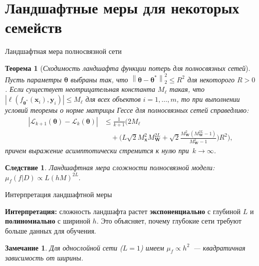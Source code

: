 \documentclass[10pt,pdf,hyperref={unicode}]{beamer}
\newtheorem{rustheorem}{Теорема}
\newtheorem{rusremark}{Замечание}
\newtheorem{ruscorollary}{Следствие}
\begin{document}
\section{Ландшафтные меры для некоторых семейств}
\begin{frame}{Ландшафтная мера полносвязной сети}
\justifying
\small

\begin{rustheorem}[\emph{Сходимость ландшафта функции потерь для полносвязных сетей}]
Пусть параметры $\boldsymbol{\theta}$ выбраны так, что $\left\|\boldsymbol{\theta} - \boldsymbol{\theta}^*\right\|_2^2 \leqslant R^2$ для некоторого $R > 0$. Если существует неотрицательная константа $M_{\ell}$ такая, что $\left| \ell(f_{\boldsymbol{\theta}^*}(\mathbf{x}_{i}), \mathbf{y}_{i}) \right| \leqslant M_{\ell}$ для всех объектов $i = 1, \ldots, m$, то при выполнении условий теоремы о норме матрицы Гессе для полносвязных сетей справедливо:
\begin{align*}
\left|\mathcal{L}_{k+1}(\boldsymbol{\theta}) - \mathcal{L}_k(\boldsymbol{\theta})\right| &\leqslant \frac{1}{k+1}\Biggl( 2M_{\ell} \\
&\quad + \Biggl( L \sqrt{2} M_{\mathbf{x}}^2 M_{\mathbf{W}}^{2L} + \sqrt{2} \frac{M_{\mathbf{W}}^2 (M_{\mathbf{W}}^{2L} - 1)}{M_{\mathbf{W}}^2 - 1} \Biggr) R^2 \Biggr),
\end{align*}
причем выражение асимптотически стремится к нулю при~$k \to \infty$.
\end{rustheorem}

\begin{ruscorollary}
Ландшафтная мера сложности полносвязной модели: $\mu_f(f|D) \propto L(hM)^{2L}.$
\end{ruscorollary}
\end{frame}
\begin{frame}{Интерпретация ландшафтной меры}
\justifying

\textbf{Интерпретация:} сложность ландшафта растет \textbf{экспоненциально} с глубиной $L$ и \textbf{полиномиально} с шириной $h$. Это объясняет, почему глубокие сети требуют больше данных для обучения.

\begin{rusremark}
    \justifying
    Для однослойной сети ($L=1$) имеем $\mu_f \propto h^2$~--- квадратичная зависимость от ширины.
\end{rusremark}
\end{frame}
\end{document}
